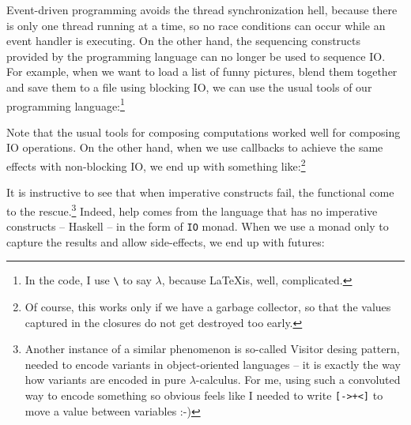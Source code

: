 Event-driven programming avoids the thread synchronization hell, because there
is only one thread running at a time, so no race conditions can occur while an
event handler is executing. On the other hand, the sequencing constructs
provided by the programming language can no longer be used to sequence IO. For
example, when we want to load a list of funny pictures, blend them together and
save them to a file using blocking IO, we can use the usual tools of our
programming language:\footnote{In the code, I use \texttt{\textbackslash} to say
$\lambda$, because \LaTeX is, well, complicated.}


Note that the usual tools for composing computations worked well for composing
IO operations. On the other hand, when we use callbacks to achieve the same
effects with non-blocking IO, we end up with something like:\footnote{Of
course, this works only if we have a garbage collector, so that the values
captured in the closures do not get destroyed too early.}


It is instructive to see that when imperative constructs fail, the functional
come to the rescue.\footnote{Another instance of a similar phenomenon is
so-called Visitor desing pattern, needed to encode variants in object-oriented
languages -- it is exactly the way how variants are encoded in pure
$\lambda$-calculus. For me, using such a convoluted way to encode something so
obvious feels like I needed to write \texttt{[->+<]} to move a value between
variables :-)} Indeed, help comes from the language that has no imperative
constructs -- Haskell -- in the form of \texttt{IO} monad. When we use a monad
only to capture the results and allow side-effects, we end up with futures: 

